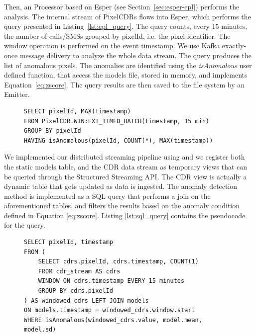 {Then, an Processor based on Esper (see Section~\ref{sec:esper-epl}) performs the analysis. The internal stream of PixelCDRs flows into Esper, which performs the query presented in Listing~\ref{lst:epl_query}. The query counts, every 15 minutes, the number of calls/SMSs grouped by pixelId, i.e. the pixel identifier.
The window operation is performed on the event timestamp. We use Kafka exactly-once message delivery to analyze the whole data stream. The query produces the list of anomalous pixels.
The anomalies are identified using the \textit{isAnomalous} user defined function, that access the models file, stored in memory, and implements Equation~\eqref{eq:zscore}.
The query results are then saved to the file system by an Emitter.

\begin{figure}[ht]
\begin{minipage}{0.95\linewidth}
\begin{lstlisting}[caption={EPL query performed by Esper Processor},frame=single,captionpos=b,label=lst:epl_query,style=ESPER]
SELECT pixelId, MAX(timestamp)
FROM PixelCDR.WIN:EXT_TIMED_BATCH(timestamp, 15 min) 
GROUP BY pixelId 
HAVING isAnomalous(pixelId, COUNT(*), MAX(timestamp))
\end{lstlisting}
\end{minipage}
\end{figure}

We implemented our distributed streaming pipeline using \sparkdi{} and we register both the static models table, and the CDR data stream as temporary views that can be queried through the Structured Streaming API. The CDR view is actually a dynamic table that gets updated as data is ingested. The anomaly detection method is implemented as a SQL query that performs a join on the aforementioned tables, and filters the results based on the anomaly condition defined in Equation \eqref{eq:zscore}. Listing \ref{lst:sql_query} contains the pseudocode for the query.

\begin{figure}[ht]
\begin{minipage}{0.95\linewidth}
\begin{lstlisting}[caption={Spark SQL anomaly detection query},frame=single,captionpos=b,label=lst:sql_query,style=SPARKSQL]
SELECT pixelId, timestamp
FROM (
	SELECT cdrs.pixelId, cdrs.timestamp, COUNT(1)
	FROM cdr_stream AS cdrs
	WINDOW ON cdrs.timestamp EVERY 15 minutes
	GROUP BY cdrs.pixelId
) AS windowed_cdrs LEFT JOIN models 
ON models.timestamp = windowed_cdrs.window.start 
WHERE isAnomalous(windowed_cdrs.value, model.mean, model.sd)
\end{lstlisting}
\end{minipage}
\end{figure}

}
